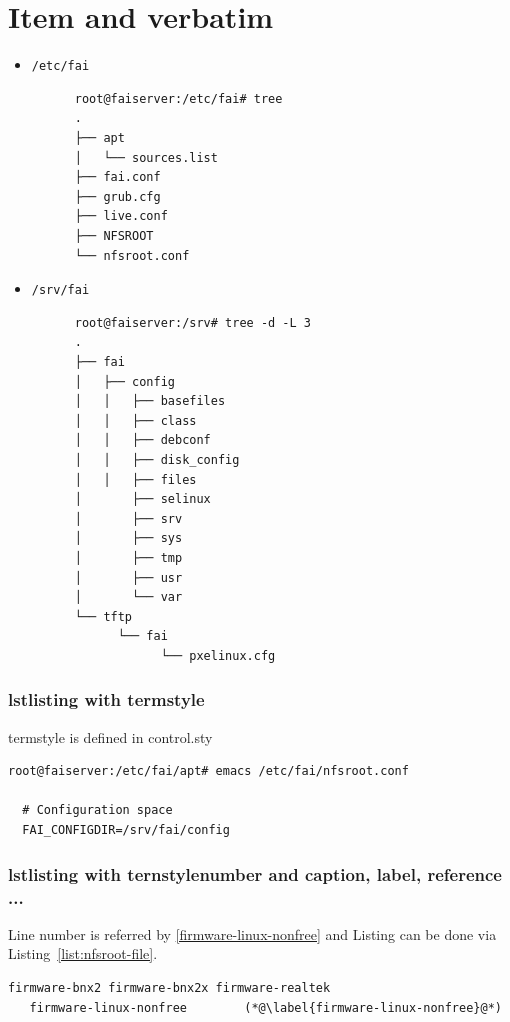 \documentclass[11pt
  , a4paper
  , article
  , oneside
]{memoir}
\begin{document}
{\clearpage

\chapter{Item and verbatim}

\begin{itemize}
  \item \texttt{/etc/fai}
    {\scriptsize
     \begin{verbatim}
      root@faiserver:/etc/fai# tree
      .
      ├── apt
      │   └── sources.list
      ├── fai.conf
      ├── grub.cfg
      ├── live.conf
      ├── NFSROOT
      └── nfsroot.conf
     \end{verbatim}
     }
  \item \texttt{/srv/fai}
    {\scriptsize
     \begin{verbatim}
      root@faiserver:/srv# tree -d -L 3
      .
      ├── fai
      │   ├── config
      │   │   ├── basefiles
      │   │   ├── class
      │   │   ├── debconf
      │   │   ├── disk_config
      │   │   ├── files
      │       ├── selinux
      │       ├── srv
      │       ├── sys
      │       ├── tmp
      │       ├── usr
      │       └── var
      └── tftp
            └── fai
                  └── pxelinux.cfg
  \end{verbatim}
  }
\end{itemize}

\subsection{lstlisting with termstyle}

termstyle is defined in control.sty

\begin{lstlisting}[style=termstyle]
root@faiserver:/etc/fai/apt# emacs /etc/fai/nfsroot.conf 

  # Configuration space
  FAI_CONFIGDIR=/srv/fai/config
\end{lstlisting}


\subsection{lstlisting with ternstylenumber and caption, label, reference  ... }

Line number is referred by \ref{firmware-linux-nonfree} and Listing can be done via Listing~\ref{list:nfsroot-file}. 

\begin{lstlisting}[style=termstylenumber, caption={Editing \texttt{/etc/fai/NFSROOT}}, label={list:nfsroot-file}]
   firmware-bnx2 firmware-bnx2x firmware-realtek
   firmware-linux-nonfree        (*@\label{firmware-linux-nonfree}@*) 


\end{lstlisting}}
\end{document}
